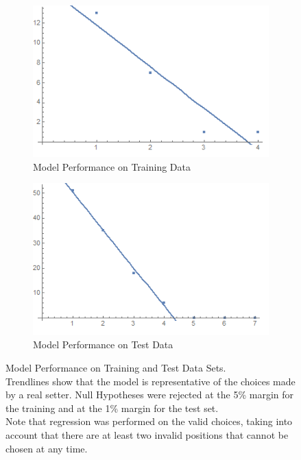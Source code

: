 \documentclass[main.tex]{subfiles}
\begin{document}
        \begin{figure}[h!]
          \begin{subfigure}{0.5\linewidth}
            \centering
            \includegraphics[width=0.80\linewidth]{figures/trainingGraph}
            \caption{Model Performance on Training Data}
            \label{fig:training}
          \end{subfigure}
          \begin{subfigure}{0.5\linewidth}
            \centering
            \includegraphics[width=0.80\linewidth]{figures/testGraph}
            \caption{Model Performance on Test Data}
            \label{fig:test}
          \end{subfigure}
          \caption{Model Performance on Training and Test Data Sets. \\
            Trendlines show that the model is representative of the choices made by a real setter. Null Hypotheses were rejected at the 5\% margin for the training and at the 1\% margin for the test set. \\
            Note that regression was performed on the valid choices, taking into account that there are at least two invalid positions that cannot be chosen at any time.
            }
          \label{fig:analysis}
        \end{figure}
        
\end{document}

